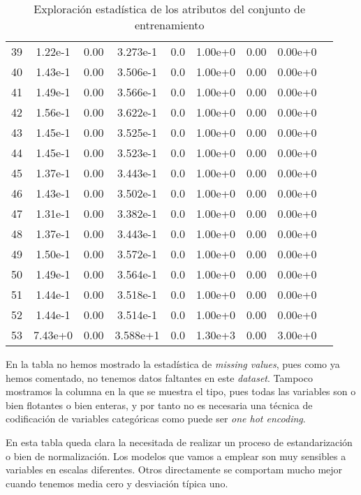 \documentclass[11pt]{article}
\begin{document}
\begin{table}[H]
{\begin{tabular}{|c|c|c|c|c|c|c|c|c|}
    39   & 1.22e-1&       0.00&  3.273e-1&     0.0&  1.00e+0&      0.00&  0.00e+0 \\
    40   & 1.43e-1&       0.00&  3.506e-1&     0.0&  1.00e+0&      0.00&  0.00e+0 \\
    41   & 1.49e-1&       0.00&  3.566e-1&     0.0&  1.00e+0&      0.00&  0.00e+0 \\
    42   & 1.56e-1&       0.00&  3.622e-1&     0.0&  1.00e+0&      0.00&  0.00e+0 \\
    43   & 1.45e-1&       0.00&  3.525e-1&     0.0&  1.00e+0&      0.00&  0.00e+0 \\
    44   & 1.45e-1&       0.00&  3.523e-1&     0.0&  1.00e+0&      0.00&  0.00e+0 \\
    45   & 1.37e-1&       0.00&  3.443e-1&     0.0&  1.00e+0&      0.00&  0.00e+0 \\
    46   & 1.43e-1&       0.00&  3.502e-1&     0.0&  1.00e+0&      0.00&  0.00e+0 \\
    47   & 1.31e-1&       0.00&  3.382e-1&     0.0&  1.00e+0&      0.00&  0.00e+0 \\
    48   & 1.37e-1&       0.00&  3.443e-1&     0.0&  1.00e+0&      0.00&  0.00e+0 \\
    49   & 1.50e-1&       0.00&  3.572e-1&     0.0&  1.00e+0&      0.00&  0.00e+0 \\
    50   & 1.49e-1&       0.00&  3.564e-1&     0.0&  1.00e+0&      0.00&  0.00e+0 \\
    51   & 1.44e-1&       0.00&  3.518e-1&     0.0&  1.00e+0&      0.00&  0.00e+0 \\
    52   & 1.44e-1&       0.00&  3.514e-1&     0.0&  1.00e+0&      0.00&  0.00e+0 \\
    53   & 7.43e+0&       0.00&  3.588e+1&     0.0&  1.30e+3&      0.00&  3.00e+0 \\
    \hline
  \end{tabular}
}
\caption{Exploración estadística de los atributos del conjunto de entrenamiento}
\end{table}

En la tabla no hemos mostrado la estadística de \emph{missing values}, pues como ya hemos comentado, no tenemos datos faltantes en este \emph{dataset}. Tampoco mostramos la columna en la que se muestra el tipo, pues todas las variables son o bien flotantes o bien enteras, y por tanto no es necesaria una técnica de codificación de variables categóricas como puede ser \emph{one hot encoding}.

En esta tabla queda clara la necesitada de realizar un proceso de estandarización o bien de normalización. Los modelos que vamos a emplear son muy sensibles a variables en escalas diferentes. Otros directamente se comportam mucho mejor cuando tenemos media cero y desviación típica uno.
\end{document}
